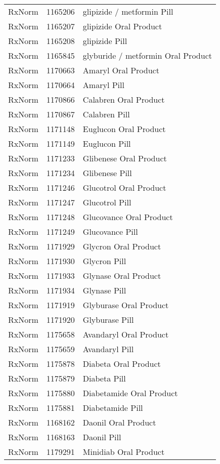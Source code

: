 \begin{longtable}{p{}p{}p{}}
  RxNorm & 1165206 & glipizide / metformin Pill \\ 
  RxNorm & 1165207 & glipizide Oral Product \\ 
  RxNorm & 1165208 & glipizide Pill \\ 
  RxNorm & 1165845 & glyburide / metformin Oral Product \\ 
  RxNorm & 1170663 & Amaryl Oral Product \\ 
  RxNorm & 1170664 & Amaryl Pill \\ 
  RxNorm & 1170866 & Calabren Oral Product \\ 
  RxNorm & 1170867 & Calabren Pill \\ 
  RxNorm & 1171148 & Euglucon Oral Product \\ 
  RxNorm & 1171149 & Euglucon Pill \\ 
  RxNorm & 1171233 & Glibenese Oral Product \\ 
  RxNorm & 1171234 & Glibenese Pill \\ 
  RxNorm & 1171246 & Glucotrol Oral Product \\ 
  RxNorm & 1171247 & Glucotrol Pill \\ 
  RxNorm & 1171248 & Glucovance Oral Product \\ 
  RxNorm & 1171249 & Glucovance Pill \\ 
  RxNorm & 1171929 & Glycron Oral Product \\ 
  RxNorm & 1171930 & Glycron Pill \\ 
  RxNorm & 1171933 & Glynase Oral Product \\ 
  RxNorm & 1171934 & Glynase Pill \\ 
  RxNorm & 1171919 & Glyburase Oral Product \\ 
  RxNorm & 1171920 & Glyburase Pill \\ 
  RxNorm & 1175658 & Avandaryl Oral Product \\ 
  RxNorm & 1175659 & Avandaryl Pill \\ 
  RxNorm & 1175878 & Diabeta Oral Product \\ 
  RxNorm & 1175879 & Diabeta Pill \\ 
  RxNorm & 1175880 & Diabetamide Oral Product \\ 
  RxNorm & 1175881 & Diabetamide Pill \\ 
  RxNorm & 1168162 & Daonil Oral Product \\ 
  RxNorm & 1168163 & Daonil Pill \\ 
  RxNorm & 1179291 & Minidiab Oral Product \\ 

\end{longtable}
